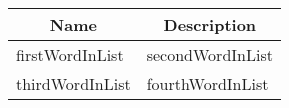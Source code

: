 {\scriptsize
\begin{longtable}{|p{}|p{}|}
\hline
   	\multicolumn{1}{|c|}{\cellcolor{colorTblHeader} \textbf{Name}} & \multicolumn{1}{|c|}{\cellcolor{colorTblHeader} \textbf{Description}}\\ \hline
   	firstWordInList & secondWordInList\\ \hline
   	thirdWordInList & fourthWordInList\\ \hline
\end{longtable}
}
